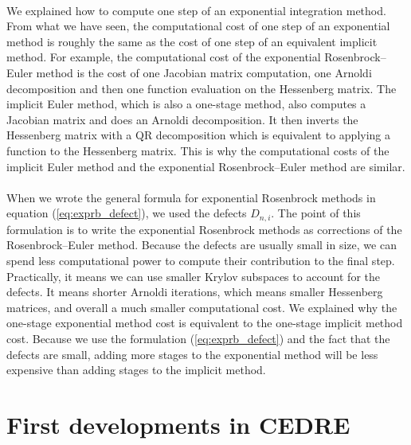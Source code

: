   \paragraph{}
  We explained how to compute one step of an exponential integration method.
  From what we have seen, the computational cost of one step of an exponential method is roughly the same as the cost of one step of an equivalent implicit method.
  For example, the computational cost of the exponential Rosenbrock--Euler method is the cost of one Jacobian matrix computation, one Arnoldi decomposition and then one function evaluation on the Hessenberg matrix.
  The implicit Euler method, which is also a one-stage method, also computes a Jacobian matrix and does an Arnoldi decomposition.
  It then inverts the Hessenberg matrix with a QR decomposition which is equivalent to applying a function to the Hessenberg matrix.
  This is why the computational costs of the implicit Euler method and the exponential Rosenbrock--Euler method are similar.

  \paragraph{}
  When we wrote the general formula for exponential Rosenbrock methods in equation (\ref{eq:exprb_defect}), we used the defects $D_{n,i}$.
  The point of this formulation is to write the exponential Rosenbrock methods as corrections of the Rosenbrock--Euler method.
  Because the defects are usually small in size, we can spend less computational power to compute their contribution to the final step.
  Practically, it means we can use smaller Krylov subspaces to account for the defects.
  It means shorter Arnoldi iterations, which means smaller Hessenberg matrices, and overall a much smaller computational cost.
  We explained why the one-stage exponential method cost is equivalent to the one-stage implicit method cost.
  Because we use the formulation (\ref{eq:exprb_defect}) and the fact that the defects are small, adding more stages to the exponential method will be less expensive than adding stages to the implicit method.


  \section{First developments in CEDRE}

